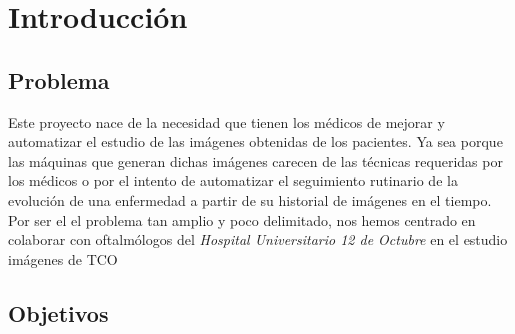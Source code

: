 \chapter{Introducción}
\section{Problema}
Este proyecto nace de la necesidad que tienen los médicos de mejorar y
automatizar el estudio de las imágenes obtenidas de los pacientes. Ya
sea porque las máquinas que generan dichas imágenes carecen de las
técnicas requeridas por los médicos o por el intento de automatizar el
seguimiento rutinario de la evolución de una enfermedad a partir de su
historial de imágenes en el tiempo. \\
Por ser el el problema tan amplio y poco delimitado, nos hemos
centrado en colaborar con oftalmólogos del \emph{Hospital Universitario
  12 de Octubre} en el estudio imágenes de \ac{TCO}

\section{Objetivos}
